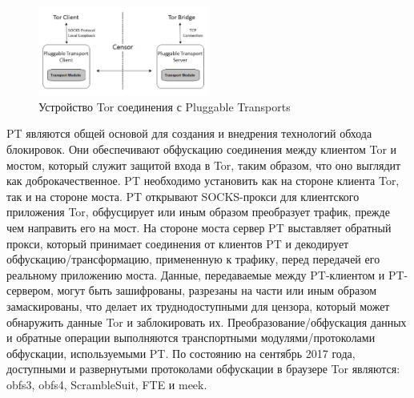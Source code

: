 \begin{figure}[h!]
    \begin{center}
        \includegraphics[width = 0.5\textwidth]{tor_pt.png}
        \caption{Устройство Tor соединения с Pluggable Transports}
    \end{center}
\end{figure}

PT являются общей основой для создания и внедрения технологий обхода блокировок.
Они обеспечивают обфускацию соединения между клиентом Tor и мостом, который служит защитой входа в Tor,
таким образом, что оно выглядит как доброкачественное.
PT необходимо установить как на стороне клиента Tor, так и на стороне моста.
PT открывают SOCKS-прокси для клиентского приложения Tor, обфусцирует или иным образом преобразует трафик, прежде чем направить его на мост.
На стороне моста сервер PT выставляет обратный прокси, который принимает соединения от клиентов PT и декодирует обфускацию/трансформацию,
примененную к трафику, перед передачей его реальному приложению моста.
Данные, передаваемые между PT-клиентом и PT-сервером, могут быть зашифрованы, разрезаны на части или иным образом замаскированы,
что делает их труднодоступными для цензора, который может обнаружить данные Tor и заблокировать их.
Преобразование/обфускация данных и обратные операции выполняются транспортными модулями/протоколами обфускации, используемыми PT.
По состоянию на сентябрь 2017 года, доступными и развернутыми протоколами обфускации в браузере Tor являются: obfs3, obfs4, ScrambleSuit, FTE и meek.

